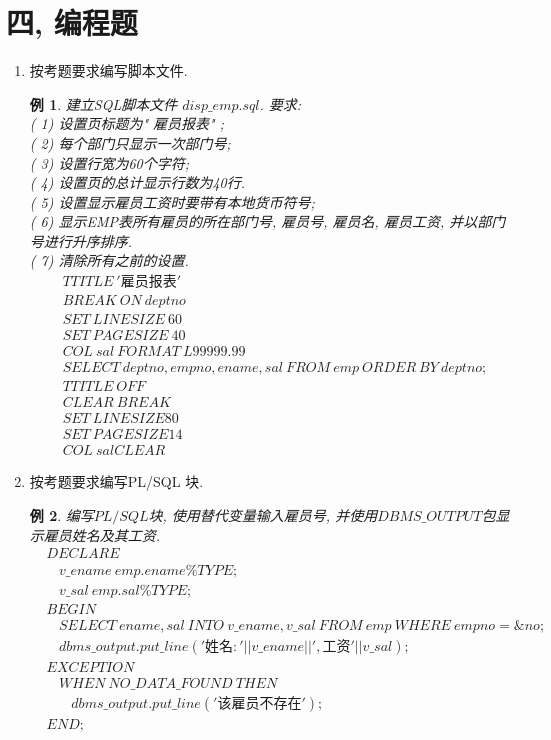 \documentclass{article}                     %
\numberwithin{equation}{section}            %
\numberwithin{figure}{section}              %
\numberwithin{table}{section}               %
\newtheorem{example}{\indent 例}[section]
\begin{document}
\section{四, 编程题}
\begin{enumerate}
\item 按考题要求编写脚本文件. \\
\begin{example}
    建立SQL脚本文件 $disp\_emp.sql$.  要求: \\
    ( 1) 设置页标题为" 雇员报表" ; \\
    ( 2) 每个部门只显示一次部门号; \\
    ( 3) 设置行宽为60个字符; \\
    ( 4) 设置页的总计显示行数为40行. \\
    ( 5) 设置显示雇员工资时要带有本地货币符号; \\
    ( 6) 显示EMP表所有雇员的所在部门号, 雇员号, 雇员名, 雇员工资, 并以部门号进行升序排序. \\
    ( 7) 清除所有之前的设置. \\
    \begin{align*}
    &TTITLE \ ' \mbox{雇员报表}' \\
    &BREAK \ ON \ deptno\\
    &SET \ LINESIZE \ 60\\
    &SET \  PAGESIZE \  40\\
    &COL \  sal \  FORMAT \  L99999.99\\
    &SELECT \  deptno,empno,ename,sal\  FROM\  emp\  ORDER\  BY\  deptno;\\
    &TTITLE \  OFF\\
    &CLEAR \  BREAK\\
    &SET \  LINESIZE 80\\
    &SET \  PAGESIZE 14\\
    &COL \  sal CLEAR
    \end{align*}
\end{example}

\item 按考题要求编写PL/SQL 块. \\
\begin{example}
    编写$PL/SQL$块, 使用替代变量输入雇员号, 并使用$DBMS\_OUTPUT$包显示雇员姓名及其工资. \\
    \begin{align*}
    &DECLARE\\
    & \ \ \ \ v\_ename \ emp.ename\%TYPE;\\
    & \ \ \ \ v\_sal \ emp.sal\%TYPE;\\
    &BEGIN\\
    & \ \ \ \ SELECT\  ename,sal\  INTO \  v\_ename,v\_sal \  FROM \ emp \ WHERE \ empno=\&no;\\
    & \ \ \ \ dbms\_output.put\_line('\mbox{姓名}: '||v\_ename||',\mbox{工资}'||v\_sal);\\
    &EXCEPTION\\
    &\ \ \ \ WHEN \ NO\_DATA\_FOUND \ THEN\\
    & \ \ \ \ \ \ \ \  dbms\_output.put\_line('\mbox{该雇员不存在}');\\
    &END;
    \end{align*}
\end{example}


\end{enumerate}
\end{document}
